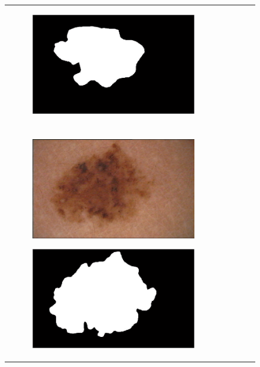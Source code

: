 \documentclass[a4paper, 10pt, conference]{ieeeconf}        %
\begin{document}
\begin{figure}[ht!]
\begin{tabular}{c c c c c}
\begin{subfigure}{0.2\textwidth}
    \end{subfigure} 
   \begin{subfigure}{0.2\textwidth}
    \includegraphics[scale=0.2]{finalGroundTrue_02.JPG}
    \end{subfigure} \\ \\
     \begin{subfigure}{0.2\textwidth}
     \includegraphics[scale=0.15]{original03.JPG}
     \end{subfigure}
     \begin{subfigure}{0.2\textwidth}
     \includegraphics[scale=0.2]{expert_1GroundTrue_03.JPG}

\end{subfigure}
\end{tabular}
\end{figure}
\end{document}
